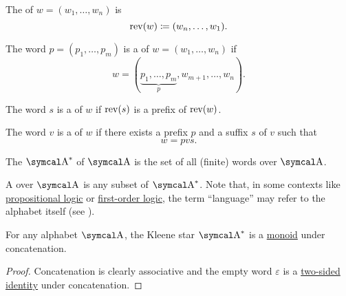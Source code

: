 \begin{definition}
\begin{DefEnum}
     The  of \( w = (w_1, \ldots, w_n) \) is
    \begin{equation*}
      \operatorname{rev}(w) \coloneqq (w_n, \ldots, w_1).
    \end{equation*}

     The word \( p = (p_1, \ldots, p_m) \) is a  of \( w = (w_1, \ldots, w_n) \) if
    \begin{equation*}
      w = (\underbrace{p_1, \ldots, p_m}_p, w_{m+1}, \ldots, w_n).
    \end{equation*}

     The word \( s \) is a  of \( w \) if \( \operatorname{rev}(s) \) is a prefix of \( \operatorname{rev}(w) \).

     The word \( v \) is a  of \( w \) if there exists a prefix \( p \) and a suffix \( s \) of \( v \) such that
    \begin{equation*}
      w = pvs.
    \end{equation*}

     The  \( \CA^{\ast} \) of \( \CA \) is the set of all (finite) words over \( \CA \).

     A  over \( \CA \) is any subset of \( \CA^{\ast} \). Note that, in some contexts like \hyperref[subsec:propositional_logic]{propositional logic} or \hyperref[subsec:first_order_logic]{first-order logic}, the term \enquote{language} may refer to the alphabet itself (see ).
  \end{DefEnum}
\end{definition}

\begin{proposition}\label{thm:kleene_star_is_monoid}
  For any alphabet \( \CA \), the Kleene star \( \CA^{\ast} \) is a \hyperref[def:unital_magma/associative]{monoid} under concatenation.
\end{proposition}
\begin{proof}
  Concatenation is clearly associative and the empty word \( \varepsilon \) is a \hyperref[def:magma_identity]{two-sided identity} under concatenation.
\end{proof}

